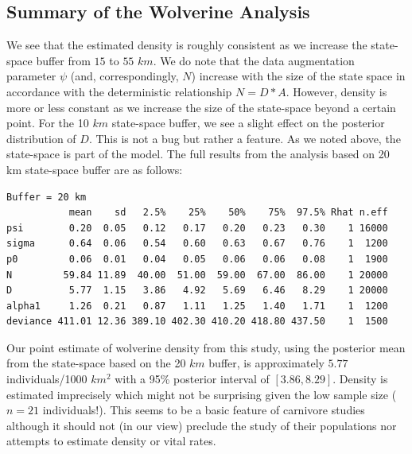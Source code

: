\subsection{Summary of the Wolverine Analysis}

We see that the estimated density is roughly consistent as we increase
the state-space buffer from $15$ to $55$ $km$. We do note that the data
augmentation parameter $\psi$ (and, correspondingly, $N$) increase with
the size of the state space in accordance with the deterministic
relationship $N= D*A$. However, density is more or less constant as we
increase the size of the state-space beyond a certain point.  For the
10 $km$ state-space buffer, we see a slight effect on the posterior
distribution of $D$. This is not a bug but rather a feature. As we noted
above, the state-space is part of the model.
The full results from the analysis based on 20 km state-space buffer
are as follows:
{\small
\begin{verbatim}
Buffer = 20 km
           mean    sd   2.5%    25%    50%    75%  97.5% Rhat n.eff
psi        0.20  0.05   0.12   0.17   0.20   0.23   0.30    1 16000
sigma      0.64  0.06   0.54   0.60   0.63   0.67   0.76    1  1200
p0         0.06  0.01   0.04   0.05   0.06   0.06   0.08    1  1900
N         59.84 11.89  40.00  51.00  59.00  67.00  86.00    1 20000
D          5.77  1.15   3.86   4.92   5.69   6.46   8.29    1 20000
alpha1     1.26  0.21   0.87   1.11   1.25   1.40   1.71    1  1200
deviance 411.01 12.36 389.10 402.30 410.20 418.80 437.50    1  1500
\end{verbatim}
} 
Our point estimate of wolverine density from this study, using the
posterior mean from the state-space based on the 20 $km$ buffer, is
approximately $5.77$ individuals/1000 $km^2$ with a 95\% posterior
interval of $[3.86, 8.29]$. Density is estimated imprecisely which
might not be surprising given the low sample size ($n=21$
individuals!). This seems to be a basic feature of carnivore studies
although it should not (in our view) preclude the study of their
populations nor attempts to estimate density or vital rates.

